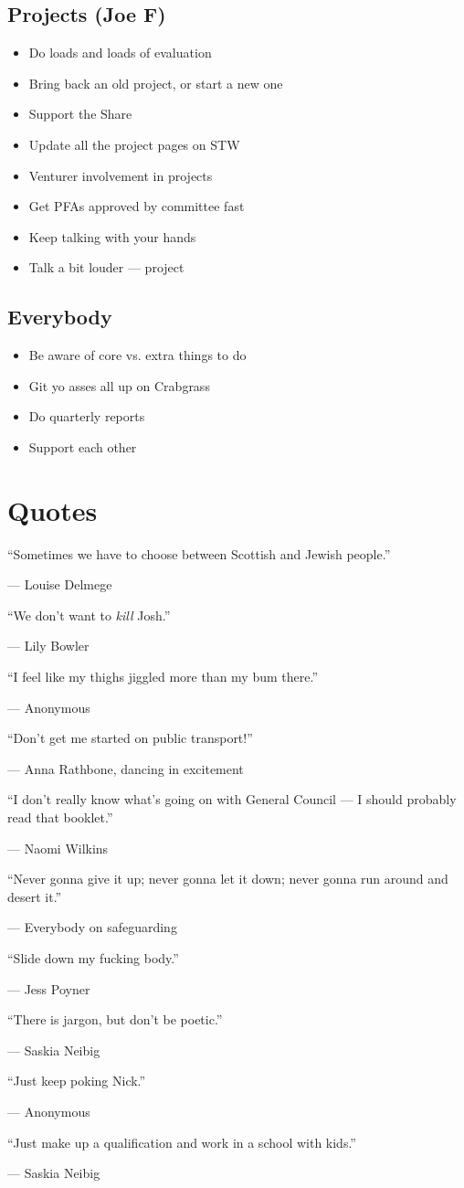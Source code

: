 \documentclass[a4paper, 11pt]{article} %
\newcommand{\myquote}[2][Anonymous]{
``#2''

\hspace{15pt} --- #1
}
\begin{document}
\subsection{Projects (Joe F)}
\begin{itemize}
	\item Do loads and loads of evaluation
	\item Bring back an old project, or start a new one
	\item Support the Share
	\item Update all the project pages on STW
	\item Venturer involvement in projects
	\item Get PFAs approved by committee fast
	\item Keep talking with your hands
	\item Talk a bit louder --- project
\end{itemize}

\subsection{Everybody}
\begin{itemize}
	\item Be aware of core vs. extra things to do
	\item Git yo asses all up on Crabgrass
	\item Do quarterly reports
	\item Support each other
\end{itemize}

\section{Quotes}
\myquote[Louise Delmege]{Sometimes we have to choose between Scottish and Jewish people.}

\myquote[Lily Bowler]{We don't want to \emph{kill} Josh.}

\myquote{I feel like my thighs jiggled more than my bum there.}

\myquote[Anna Rathbone, dancing in excitement]{Don't get me started on public transport!}

\myquote[Naomi Wilkins]{I don't really know what's going on with General Council --- I should probably read that booklet.}

\myquote[Everybody on safeguarding]{Never gonna give it up; never gonna let it down; never gonna run around and desert it.}

\myquote[Jess Poyner]{Slide down my fucking body.}

\myquote[Saskia Neibig]{There is jargon, but don't be poetic.}

\myquote{Just keep poking Nick.}

\myquote[Saskia Neibig]{Just make up a qualification and work in a school with kids.}
\end{document}
